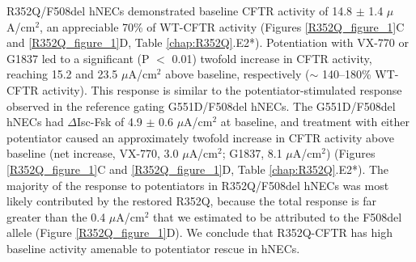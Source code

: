 	R352Q/F508del hNECs demonstrated baseline CFTR activity of 14.8 $\pm$ 1.4 $\mu$A/cm$^2$, an appreciable 70\% of WT-CFTR activity (Figures \ref{R352Q_figure_1}C and \ref{R352Q_figure_1}D, Table \ref{chap:R352Q}.E2*). Potentiation with VX-770 or G1837 led to a significant (P $<$ 0.01) twofold increase in CFTR activity, reaching 15.2 and 23.5 $\mu$A/cm$^2$ above baseline, respectively ($\sim$ 140–180\% WT-CFTR activity). This response is similar to the potentiator-stimulated response observed in the reference gating G551D/F508del hNECs. The G551D/F508del hNECs had $\Delta$Isc-Fsk of 4.9 $\pm$ 0.6 $\mu$A/cm$^2$ at baseline, and treatment with either potentiator caused an approximately twofold increase in CFTR activity above baseline (net increase, VX-770, 3.0 $\mu$A/cm$^2$; G1837, 8.1 $\mu$A/cm$^2$) (Figures \ref{R352Q_figure_1}C and \ref{R352Q_figure_1}D, Table \ref{chap:R352Q}.E2*). The majority of the response to potentiators in R352Q/F508del hNECs was most likely contributed by the restored R352Q, because the total response is far greater than the 0.4 $\mu$A/cm$^2$ that we estimated to be attributed to the F508del allele (Figure \ref{R352Q_figure_1}D). We conclude that R352Q-CFTR has high baseline activity amenable to potentiator rescue in hNECs.

